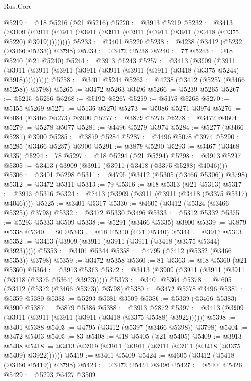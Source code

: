 \begin{lexlean}{RustCore}
\begin{coremodule}
@5219 := @18 @5216 (@21 @5216)
@5220 := @3913 @5219
@5232 := @3413
    (@3909 (@3911 (@3911 (@3911 (@3911 (@3911 (@3911 (@3911 (@3418 (@3375 @5220) @3919)))))))))
@5233 := @3401 @5220
@5238 := @4238 (@3412 (@5232 (@3466 @5233)) @3798)
@5239 := @3472 @5238
@5240 := 77
@5243 := @18 @5240 (@21 @5240)
@5244 := @3913 @5243
@5257 := @3413
    (@3909
      (@3911 (@3911 (@3911 (@3911 (@3911 (@3911 (@3911 (@3911 (@3418 (@3375 @5244) @3918))))))))))
@5258 := @3401 @5244
@5263 := @4238 (@3412 (@5257 (@3466 @5258)) @3798)
@5265 := @3472 @5263 @3496
@5266 := @5239 @5265
@5267 := @5215 @5266
@5268 := @5192 @5267
@5269 := @5175 @5268
@5270 := @5155 @5269
@5271 := @5136 @5270
@5273 := @5086 @5271 @3974
@5276 := @5084 (@3466 @5273) @3900
@5277 := @3879 @5276
@5278 := @3472 @4604
@5279 := @5278 @5077
@5281 := @4496 @5279 @3974
@5284 := @5277 (@3466 @5281) @3900
@5285 := @3879 @5284
@5287 := @4496 @5078 @3974
@5290 := @5285 (@3466 @5287) @3900
@5291 := @3879 @5290
@5293 := @3467 (@3468 @335)
@5294 := 78
@5297 := @18 @5294 (@21 @5294)
@5298 := @3913 @5297
@5305 := @3413 (@3909 (@3911 (@3911 (@3418 (@3375 @5298) @4046))))
@5306 := @3401 @5298
@5311 := @4795 (@3412 (@5305 (@3466 @5306)) @3798)
@5312 := @3472 @5311
@5313 := 79
@5316 := @18 @5313 (@21 @5313)
@5317 := @3913 @5316
@5324 := @3413 (@3909 (@3911 (@3911 (@3418 (@3375 @5317) @4046))))
@5325 := @3401 @5317
@5330 := @4605 (@3412 (@5324 (@3466 @5325)) @3798)
@5332 := @3472 @5330 @3496
@5333 := @5312 @5332
@5335 := @5293 @5333 @3509
@5338 := @5291 (@3466 @5335) @3900
@5339 := @3879 @5338
@5340 := 80
@5343 := @18 @5340 (@21 @5340)
@5344 := @3913 @5343
@5352 := @3413 (@3909 (@3911 (@3911 (@3911 (@3418 (@3375 @5344) @3923)))))
@5353 := @3401 @5344
@5358 := @4795 (@3412 (@5352 (@3466 @5353)) @3798)
@5359 := @3472 @5358
@5360 := 81
@5363 := @18 @5360 (@21 @5360)
@5364 := @3913 @5363
@5372 := @3413 (@3909 (@3911 (@3911 (@3911 (@3418 (@3375 @5364) @3923)))))
@5373 := @3401 @5364
@5378 := @4605 (@3412 (@5372 (@3466 @5373)) @3798)
@5380 := @3472 @5378 @3496
@5381 := @5359 @5380
@5383 := @5293 @5381 @3509
@5386 := @5339 (@3466 @5383) @3900
@5387 := @3879 @5386
@5388 := @3913 @2872
@5397 := @3413 (@3909 (@3911 (@3911 (@3911 (@3911 (@3418 (@3375 @5388) @3922))))))
@5398 := @3401 @5388
@5403 := @4795 (@3412 (@5397 (@3466 @5398)) @3798)
@5404 := @3472 @5403
@5405 := 83
@5408 := @18 @5405 (@21 @5405)
@5409 := @3913 @5408
@5418 := @3413 (@3909 (@3911 (@3911 (@3911 (@3911 (@3418 (@3375 @5409) @3922))))))
@5419 := @3401 @5409
@5424 := @4605 (@3412 (@5418 (@3466 @5419)) @3798)
@5426 := @3472 @5424 @3496
@5427 := @5404 @5426
@5429 := @5293 @5427 @3509

\end{coremodule}
\end{lexlean}
